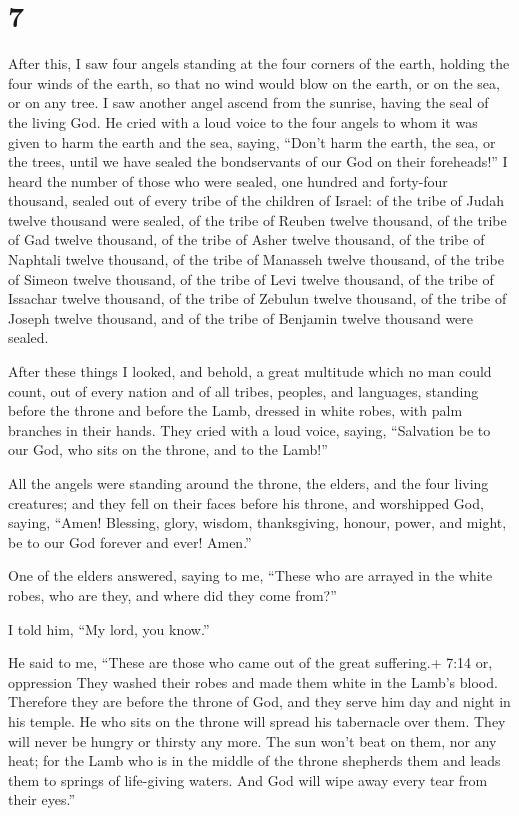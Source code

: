 \hypertarget{section-6}{%
\section{7}\label{section-6}}

 After this, I saw four angels standing at the four corners
of the earth, holding the four winds of the earth, so that no wind would
blow on the earth, or on the sea, or on any tree.  I saw
another angel ascend from the sunrise, having the seal of the living
God. He cried with a loud voice to the four angels to whom it was given
to harm the earth and the sea,  saying, ``Don't harm the
earth, the sea, or the trees, until we have sealed the bondservants of
our God on their foreheads!''  I heard the number of those
who were sealed, one hundred and forty-four thousand, sealed out of
every tribe of the children of Israel:  of the tribe of
Judah twelve thousand were sealed, of the tribe of Reuben twelve
thousand, of the tribe of Gad twelve thousand,  of the tribe
of Asher twelve thousand, of the tribe of Naphtali twelve thousand, of
the tribe of Manasseh twelve thousand,  of the tribe of
Simeon twelve thousand, of the tribe of Levi twelve thousand, of the
tribe of Issachar twelve thousand,  of the tribe of Zebulun
twelve thousand, of the tribe of Joseph twelve thousand, and of the
tribe of Benjamin twelve thousand were sealed.

 After these things I looked, and behold, a great multitude
which no man could count, out of every nation and of all tribes,
peoples, and languages, standing before the throne and before the Lamb,
dressed in white robes, with palm branches in their hands. 
They cried with a loud voice, saying, ``Salvation be to our God, who
sits on the throne, and to the Lamb!''

 All the angels were standing around the throne, the
elders, and the four living creatures; and they fell on their faces
before his throne, and worshipped God,  saying, ``Amen!
Blessing, glory, wisdom, thanksgiving, honour, power, and might, be to
our God forever and ever! Amen.''

 One of the elders answered, saying to me, ``These who are
arrayed in the white robes, who are they, and where did they come
from?''

 I told him, ``My lord, you know.''

He said to me, ``These are those who came out of the great suffering.+
7:14 or, oppression They washed their robes and made them white in the
Lamb's blood.  Therefore they are before the throne of God,
and they serve him day and night in his temple. He who sits on the
throne will spread his tabernacle over them.  They will
never be hungry or thirsty any more. The sun won't beat on them, nor any
heat;  for the Lamb who is in the middle of the throne
shepherds them and leads them to springs of life-giving waters. And God
will wipe away every tear from their eyes.''

